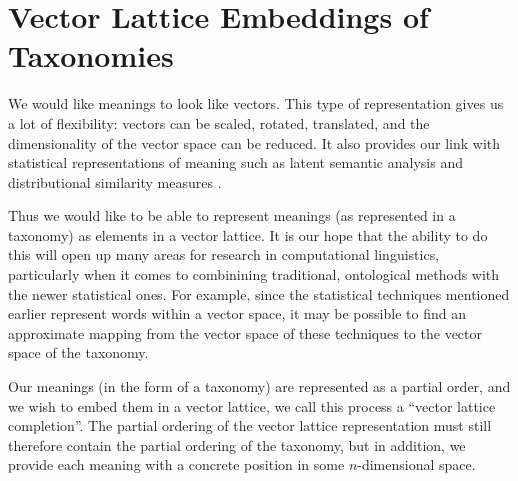 

\section{Vector Lattice Embeddings of Taxonomies}

We would like meanings to look like vectors. This type of representation gives us a lot of flexibility: vectors can be scaled, rotated, translated, and the dimensionality of the vector space can be reduced. It also provides our link with statistical representations of meaning such as latent semantic analysis \citep{Deerwester:90} and distributional similarity measures \citep{Lee:99}.

Thus we would like to be able to represent meanings (as represented in a taxonomy) as elements in a vector lattice. It is our hope that the ability to do this will open up many areas for research in computational linguistics, particularly when it comes to combinining traditional, ontological methods with the newer statistical ones. For example, since the statistical techniques mentioned earlier represent words within a vector space, it may be possible to find an approximate mapping from the vector space of these techniques to the vector space of the taxonomy.

Our meanings (in the form of a taxonomy) are represented as a partial order, and we wish to embed them in a vector lattice, we call this process a ``vector lattice completion''. The partial ordering of the vector lattice representation must still therefore contain the partial ordering of the taxonomy, but in addition, we provide each meaning with a concrete position in some $n$-dimensional space.

